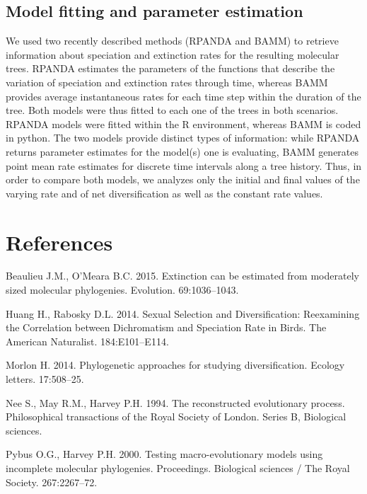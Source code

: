 \documentclass[11pt,]{article}
\begin{document}
\subsection{Model fitting and parameter
estimation}\label{model-fitting-and-parameter-estimation}

We used two recently described methods (RPANDA and BAMM) to retrieve
information about speciation and extinction rates for the resulting
molecular trees. RPANDA estimates the parameters of the functions that
describe the variation of speciation and extinction rates through time,
whereas BAMM provides average instantaneous rates for each time step
within the duration of the tree. Both models were thus fitted to each
one of the trees in both scenarios. RPANDA models were fitted within the
R environment, whereas BAMM is coded in python. The two models provide
distinct types of information: while RPANDA returns parameter estimates
for the model(s) one is evaluating, BAMM generates point mean rate
estimates for discrete time intervals along a tree history. Thus, in
order to compare both models, we analyzes only the initial and final
values of the varying rate and of net diversification as well as the
constant rate values.

\section*{References}\label{references}

Beaulieu J.M., O'Meara B.C. 2015. Extinction can be estimated from
moderately sized molecular phylogenies. Evolution. 69:1036--1043.

Huang H., Rabosky D.L. 2014. Sexual Selection and Diversification:
Reexamining the Correlation between Dichromatism and Speciation Rate in
Birds. The American Naturalist. 184:E101--E114.

Morlon H. 2014. Phylogenetic approaches for studying diversification.
Ecology letters. 17:508--25.

Nee S., May R.M., Harvey P.H. 1994. The reconstructed evolutionary
process. Philosophical transactions of the Royal Society of London.
Series B, Biological sciences.

Pybus O.G., Harvey P.H. 2000. Testing macro-evolutionary models using
incomplete molecular phylogenies. Proceedings. Biological sciences / The
Royal Society. 267:2267--72.
\end{document}
